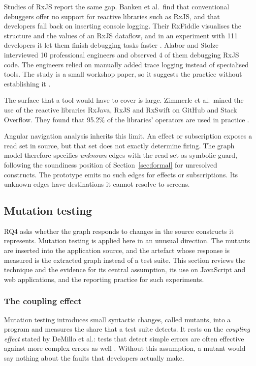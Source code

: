 Studies of RxJS report the same gap. Banken et al.\ find that conventional debuggers offer no
support for reactive libraries such as RxJS, and that developers fall back on inserting console
logging. Their RxFiddle visualises the structure and the values of an RxJS dataflow, and in an
experiment with 111 developers it let them finish debugging tasks faster
\cite{banken2018debugging}. Alabor and Stolze interviewed 10 professional engineers and observed
4 of them debugging RxJS code. The engineers relied on manually added trace logging instead of
specialised tools. The study is a small workshop paper, so it suggests the practice without
establishing it \cite{alabor2020debugging}.

The surface that a tool would have to cover is large. Zimmerle et al.\ mined the use of the
reactive libraries RxJava, RxJS and RxSwift on GitHub and Stack Overflow. They found that 95.2\%
of the libraries' operators are used in practice \cite{zimmerle2022mining}.

Angular navigation analysis inherits this limit. An effect or subscription exposes a read set
in source, but that set does not exactly determine firing. The graph model therefore
specifies \emph{unknown} edges with the read set as symbolic guard, following the soundiness
position of Section~\ref{sec:formal} for unresolved constructs. The prototype emits no such
edges for effects or subscriptions. Its unknown edges have destinations it cannot resolve
to screens.

\subsection{Mutation testing}
\label{sec:mutation}

RQ4 asks whether the graph responds to changes in the source constructs it represents. Mutation
testing is applied here in an unusual direction. The mutants are inserted into the application
source, and the artefact whose response is measured is the extracted graph instead of a test
suite. This section reviews the technique and the evidence for its central assumption, its use on
JavaScript and web applications, and the reporting practice for such experiments.

\subsubsection{The coupling effect}

Mutation testing introduces small syntactic changes, called mutants, into a program and measures
the share that a test suite detects. It rests on the \emph{coupling effect} stated by DeMillo et
al.: tests that detect simple errors are often effective against more complex errors as well
\cite{demillo1978hints}. Without this assumption, a mutant would say nothing about the faults
that developers actually make.

